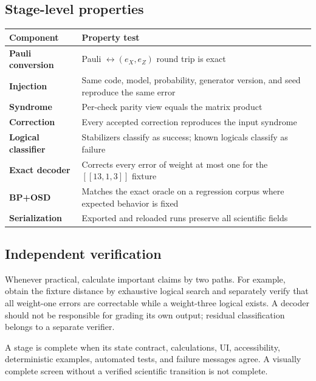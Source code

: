 \documentclass[11pt,letterpaper]{article}
\begin{document}
\subsection{Stage-level properties}

\begin{center}
\begin{tabularx}{\textwidth}{>{\bfseries}p{} X}
\toprule
Component & Property test \\
\midrule
Pauli conversion & Pauli $\leftrightarrow(e_X,e_Z)$ round trip is exact \\
Injection & Same code, model, probability, generator version, and seed reproduce the same error \\
Syndrome & Per-check parity view equals the matrix product \\
Correction & Every accepted correction reproduces the input syndrome \\
Logical classifier & Stabilizers classify as success; known logicals classify as failure \\
Exact decoder & Corrects every error of weight at most one for the $[[13,1,3]]$ fixture \\
BP+OSD & Matches the exact oracle on a regression corpus where expected behavior is fixed \\
Serialization & Exported and reloaded runs preserve all scientific fields \\
\bottomrule
\end{tabularx}
\end{center}

\subsection{Independent verification}

Whenever practical, calculate important claims by two paths. For example, obtain the fixture
distance by exhaustive logical search and separately verify that all weight-one errors are
correctable while a weight-three logical exists. A decoder should not be responsible for grading
its own output; residual classification belongs to a separate verifier.

\begin{projectbox}
A stage is complete when its state contract, calculations, UI, accessibility, deterministic
examples, automated tests, and failure messages agree. A visually complete screen without a
verified scientific transition is not complete.
\end{projectbox}
\end{document}
